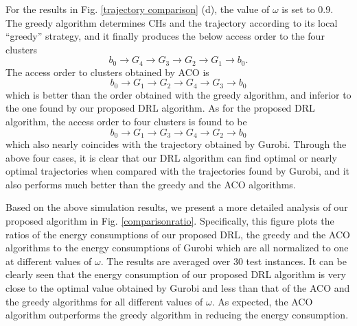 \documentclass[journal]{IEEEtran}
\begin{document}
For the results in Fig. \ref{trajectory comparison} (d), the value of $\omega$ is set to 0.9.  The greedy algorithm determines CHs and the trajectory according to its local ``greedy'' strategy, {and it finally produces the below access order to the four clusters}
\begin{equation*}
    b_0 \rightarrow G_{4} \rightarrow G_{3}  \rightarrow G_{2} \rightarrow G_{1} \rightarrow b_0.
\end{equation*}
The access order to clusters obtained by ACO is
\begin{equation*}
    b_0 \rightarrow G_{1} \rightarrow G_{2}  \rightarrow G_{4} \rightarrow G_{3} \rightarrow b_0
\end{equation*}
which is better than the order obtained with the greedy algorithm, and inferior to the one found by our proposed DRL algorithm. As for the proposed DRL algorithm, the access order to four clusters is found to be
\begin{equation*}
    b_0 \rightarrow G_{1} \rightarrow G_{3}  \rightarrow G_{4} \rightarrow G_{2} \rightarrow b_0
\end{equation*}
which also nearly coincides with the trajectory obtained by Gurobi.
Through the above four cases, it is clear that our DRL algorithm can find optimal or nearly optimal trajectories when compared with the trajectories found by Gurobi, and it also performs much better than the greedy and the ACO algorithms.


Based on the above simulation results, we present a more detailed analysis of our proposed algorithm in Fig. \ref{comparisonratio}. Specifically, this figure plots the ratios of the energy consumptions of our proposed DRL, the greedy and the ACO algorithms to the energy consumptions of Gurobi which are all normalized to one at different values of $\omega$. The results are averaged over 30 test instances. It can be clearly seen that the energy consumption of our proposed DRL algorithm is very close to the optimal value obtained by Gurobi and less than that of the ACO and the greedy algorithms for all different values of $\omega$. As expected, the ACO algorithm outperforms the greedy algorithm in reducing the energy consumption.

\end{document}
